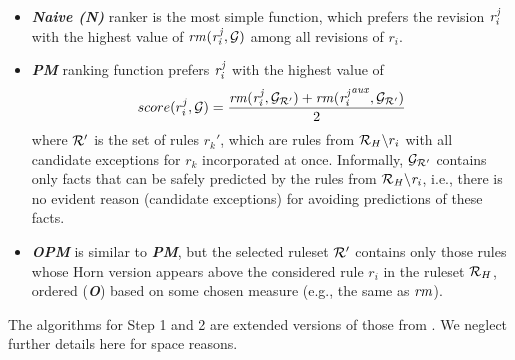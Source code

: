\begin{itemize}
\item {\textbf{\em Naive (N)}} ranker is the most simple function, which prefers the revision $\mathit{r^j_i}$ with the highest value of $\mathit{rm(r^j_{i},\mathcal{G})}$ among all revisions of $r_i$.
\smallskip

\item {\textbf{\em PM}} ranking function prefers $\mathit{r^j_i}$ with the highest value of
\begin{equation}
\label{pm}
score(r^j_i,\mathcal{G})=\dfrac{\mathit{rm(r^j_i,\mathcal{G}_{\mathcal{R}'})+rm({r^j_i}^{aux},\mathcal{G}_{\mathcal{R}'})}}{2}
\end{equation}
 where $\mathcal{R}'$ is the set of rules $r_k'$, which are rules from $\mathcal{R}_H\backslash r_i$ with all candidate exceptions for $r_k$ incorporated at once. Informally, $\mathcal{G}_{\mathcal{R}'}$ contains only facts that can be safely predicted by the rules from $\mathit{\mathcal{R}_H\backslash r_i}$, i.e., there is no evident reason (candidate exceptions) for avoiding predictions of these facts.
 \smallskip
 
\item {\textbf{\em OPM}} is similar to \textbf{{\em PM}}, but the selected ruleset $\mathcal{R}'$ contains only those rules whose Horn version appears above the considered rule $r_i$ in the ruleset $\mathcal{R}_H$, ordered (\textbf{\em O}) based on some chosen measure (e.g., the same as $\mathit{rm}$). 
\end{itemize}

The algorithms for Step 1 and 2 are extended versions of those from \cite{iswc2016}. We neglect further details here for space reasons.

